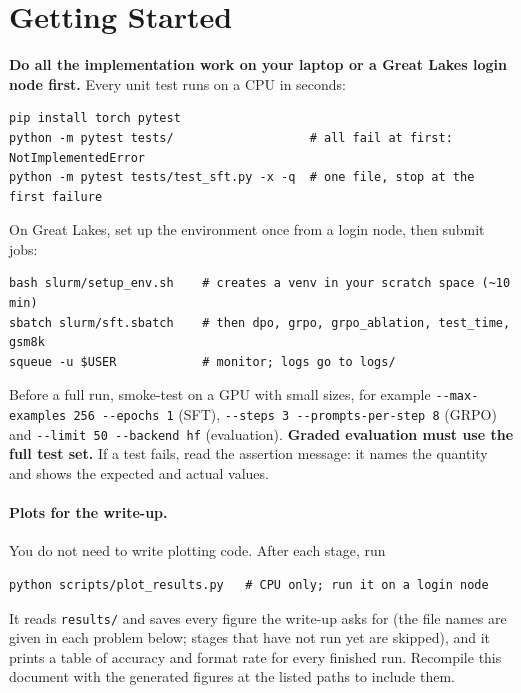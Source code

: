 \documentclass[11pt]{article}
\newcommand{\file}[1]{\texttt{#1}}
\begin{document}
\section*{Getting Started}
\textbf{Do all the implementation work on your laptop or a Great Lakes login node first.} Every unit test runs
on a CPU in seconds:
\begin{lstlisting}
pip install torch pytest
python -m pytest tests/                   # all fail at first: NotImplementedError
python -m pytest tests/test_sft.py -x -q  # one file, stop at the first failure\end{lstlisting}
On Great Lakes, set up the environment once from a login node, then submit jobs:
\begin{lstlisting}
bash slurm/setup_env.sh    # creates a venv in your scratch space (~10 min)
sbatch slurm/sft.sbatch    # then dpo, grpo, grpo_ablation, test_time, gsm8k
squeue -u $USER            # monitor; logs go to logs/\end{lstlisting}
Before a full run, smoke-test on a GPU with small sizes, for example \texttt{-{}-max-examples 256 -{}-epochs 1}
(SFT), \texttt{-{}-steps 3 -{}-prompts-per-step 8} (GRPO) and \texttt{-{}-limit 50 -{}-backend hf} (evaluation). \textbf{Graded evaluation must use
the full test set.} If a test fails, read the assertion message: it names the quantity and shows the expected
and actual values.

\paragraph{Plots for the write-up.} You do not need to write plotting code. After each stage, run
\begin{lstlisting}
python scripts/plot_results.py   # CPU only; run it on a login node\end{lstlisting}
It reads \file{results/} and saves every figure the write-up asks for (the file names are given in each
problem below; stages that have not run yet are skipped), and it prints a table of accuracy and format rate for
every finished run. Recompile this document with the generated figures at the listed paths to include them.

\end{document}

